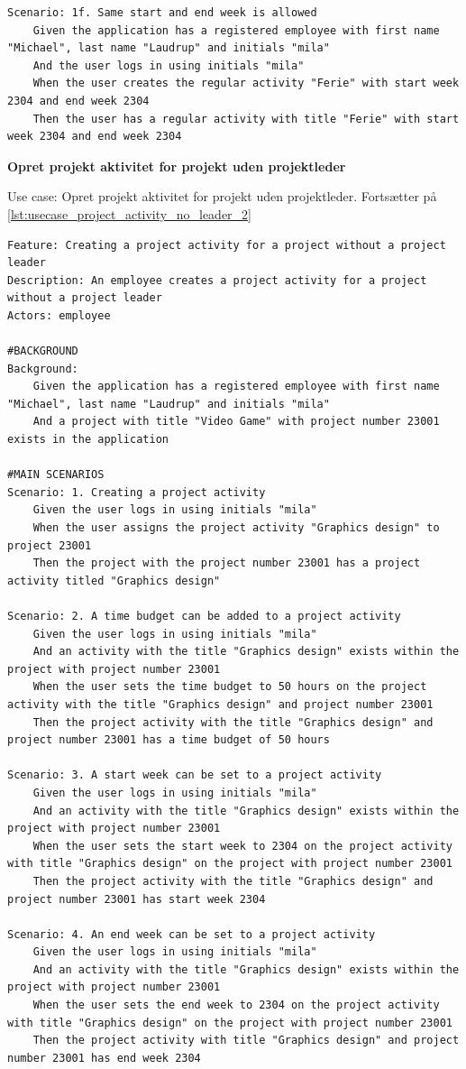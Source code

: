 \begin{listing}[H]
\begin{verbatim}
Scenario: 1f. Same start and end week is allowed
    Given the application has a registered employee with first name "Michael", last name "Laudrup" and initials "mila"
    And the user logs in using initials "mila"
    When the user creates the regular activity "Ferie" with start week 2304 and end week 2304
    Then the user has a regular activity with title "Ferie" with start week 2304 and end week 2304
    \end{verbatim}
\end{listing}
\textbf{Opret projekt aktivitet for projekt uden projektleder}
\begin{listing}[H]
    \centering
    \caption{Use case: Opret projekt aktivitet for projekt uden projektleder. Fortsætter på \cref{lst:usecase_project_activity_no_leader_2}} \label{lst:usecase_project_activity_no_leader}
    \begin{verbatim}  
Feature: Creating a project activity for a project without a project leader
Description: An employee creates a project activity for a project without a project leader
Actors: employee

#BACKGROUND
Background:
    Given the application has a registered employee with first name "Michael", last name "Laudrup" and initials "mila"
    And a project with title "Video Game" with project number 23001 exists in the application

#MAIN SCENARIOS
Scenario: 1. Creating a project activity
    Given the user logs in using initials "mila"
    When the user assigns the project activity "Graphics design" to project 23001
    Then the project with the project number 23001 has a project activity titled "Graphics design"

Scenario: 2. A time budget can be added to a project activity
    Given the user logs in using initials "mila"
    And an activity with the title "Graphics design" exists within the project with project number 23001
    When the user sets the time budget to 50 hours on the project activity with the title "Graphics design" and project number 23001
    Then the project activity with the title "Graphics design" and project number 23001 has a time budget of 50 hours

Scenario: 3. A start week can be set to a project activity
    Given the user logs in using initials "mila"
    And an activity with the title "Graphics design" exists within the project with project number 23001
    When the user sets the start week to 2304 on the project activity with title "Graphics design" on the project with project number 23001
    Then the project activity with the title "Graphics design" and project number 23001 has start week 2304

Scenario: 4. An end week can be set to a project activity
    Given the user logs in using initials "mila"
    And an activity with the title "Graphics design" exists within the project with project number 23001
    When the user sets the end week to 2304 on the project activity with title "Graphics design" on the project with project number 23001
    Then the project activity with title "Graphics design" and project number 23001 has end week 2304
    \end{verbatim}
\end{listing}
